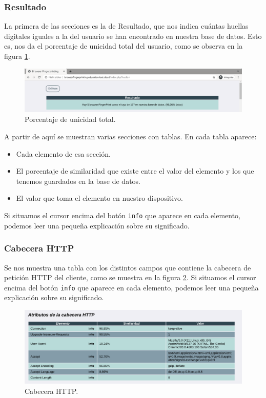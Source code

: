 \subsubsection{Resultado}
La primera de las secciones es la de Resultado, que nos indica cuántas huellas digitales iguales a la del usuario se han encontrado en nuestra base de datos. Esto es, nos da el porcentaje de unicidad total del usuario, como se observa en la figura \ref{fig:resultadoSection}. \par

\begin{figure}[tbp]
	\centering
	\includegraphics[width=1\textwidth]{Images/resultadoSection.png}
	\caption{Porcentaje de unicidad total.}
	\label{fig:resultadoSection}
\end{figure}

A partir de aquí se muestran varias secciones con tablas. En cada tabla aparece:
\begin{itemize}
	\item Cada elemento de esa sección.
	\item El porcentaje de similaridad que existe entre el valor del elemento y los que tenemos guardados en la base de datos.
	\item El valor que toma el elemento en nuestro dispositivo.
\end{itemize}

Si situamos el cursor encima del botón \texttt{info} que aparece en cada elemento, podemos leer una pequeña explicación sobre su significado.

\subsubsection{Cabecera HTTP}
Se nos muestra una tabla con los distintos campos que contiene la cabecera de petición HTTP del cliente, como se muestra en la figura \ref{fig:headersSection}. Si situamos el cursor encima del botón \texttt{info} que aparece en cada elemento, podemos leer una pequeña explicación sobre su significado.

\begin{figure}[tbp]
	\centering
	\includegraphics[width=1\textwidth]{Images/headersSection.png}
	\caption{Cabecera HTTP.}
	\label{fig:headersSection}
\end{figure}

